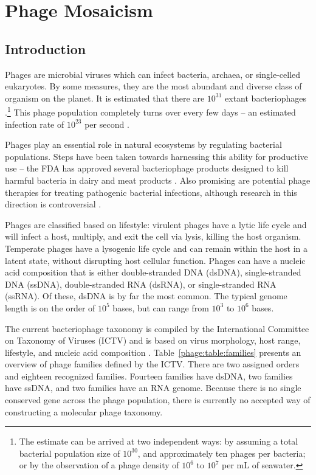 \chapter{Phage Mosaicism}
\label{ch:phage}

\section{Introduction}
\label{phage:introduction}

Phages are microbial viruses which can infect bacteria, archaea, or single-celled eukaryotes.
By some measures, they are the most abundant and diverse class of organism on the planet.
It is estimated that there are $10^31$ extant bacteriophages \cite{Rohwer:2014vz}.\footnote{The estimate can be arrived at two independent ways: by assuming a total bacterial population size of $10^30$, and approximately ten phages per bacteria; or by the observation of a phage density of $10^6$ to $10^7$ per mL of seawater.}
This phage population completely turns over every few days -- an estimated infection rate of $10^23$ per second \cite{Suttle:2007cj}.

Phages play an essential role in natural ecosystems by regulating bacterial populations.
Steps have been taken towards harnessing this ability for productive use -- the FDA has approved several bacteriophage products designed to kill harmful bacteria in dairy and meat products \cite{Bren:2007wn}.
Also promising are potential phage therapies for treating pathogenic bacterial infections, although research in this direction is controversial \cite{Keen:2012du}.

Phages are classified based on lifestyle: virulent phages have a lytic life cycle and will infect a host, multiply, and exit the cell via lysis, killing the host organism. Temperate phages have a lysogenic life cycle and can remain within the host in a latent state, without disrupting host cellular function.
Phages can have a nucleic acid composition that is either double-stranded DNA (dsDNA), single-stranded DNA (ssDNA), double-stranded RNA (dsRNA), or single-stranded RNA (ssRNA).
Of these, dsDNA is by far the most common.
The typical genome length is on the order of $10^5$ bases, but can range from $10^3$ to $10^6$ bases.

The current bacteriophage taxonomy is compiled by the International Committee on Taxonomy of Viruses (ICTV) and is based on virus morphology, host range, lifestyle, and nucleic acid composition \cite{ICTV:2012}.
Table~\ref{phage:table:families} presents an overview of phage families defined by the ICTV.
There are two assigned orders and eighteen recognized families.
Fourteen families have dsDNA, two families have ssDNA, and two families have an RNA genome.
Because there is no single conserved gene across the phage population, there is currently no accepted way of constructing a molecular phage taxonomy.

